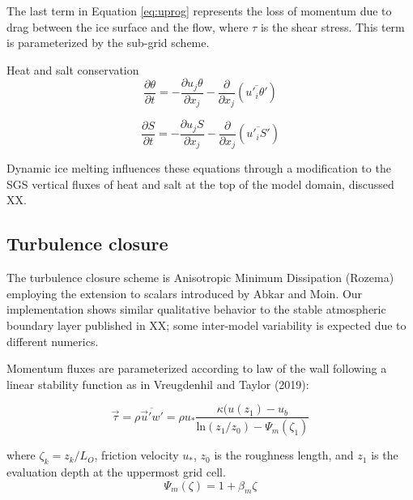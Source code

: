 \documentclass[draft]{styles/agujournal2019}
\begin{document}
The last term in Equation \ref{eq:uprog} represents the loss of momentum due to drag between the ice surface and the flow, where $\tau$ is the shear stress. This term is parameterized by the sub-grid scheme.

Heat and salt conservation
\begin{equation} \label{eq:ptprog}
\frac{\partial \theta}{\partial t} = -\frac{\partial u_j \theta}{\partial x_j} - \frac{\partial}{\partial x_j}(\overline{u'_i \theta'}) %
\end{equation}

\begin{equation} \label{eq:saprog}
\frac{\partial S}{\partial t} = -\frac{\partial u_j S}{\partial x_j} - \frac{\partial}{\partial x_j}(\overline{u'_i S'})
\end{equation}

Dynamic ice melting influences these equations through a modification to the SGS vertical fluxes of heat and salt at the top of the model domain, discussed XX.

\subsection{Turbulence closure}\label{meth:tcm}

The turbulence closure scheme is Anisotropic Minimum Dissipation (Rozema) employing the extension to scalars introduced by Abkar and Moin. Our implementation shows similar qualitative behavior to the stable atmospheric boundary layer published in XX; some inter-model variability is expected due to different numerics.

Momentum fluxes are parameterized according to law of the wall following a linear stability function as in Vreugdenhil and Taylor (2019):

\begin{equation}
    \vec{\tau} = \rho \overline{\vec{u}'w'} = \rho u_* \frac{ \kappa (u(z_1) - u_b}{\textrm{ln}(z_1/z_0)-\Psi_m(\zeta_1)}
\end{equation}

where $\zeta_k = z_k/L_O$, friction velocity $u_*$, $z_0$ is the roughness length, and $z_1$ is the evaluation depth at the uppermost grid cell.
\begin{equation}
    \Psi_m(\zeta) = 1 + \beta_m \zeta
\end{equation}
\end{document}
